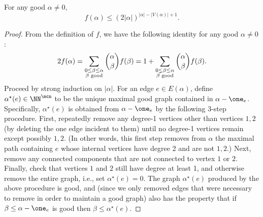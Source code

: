 \documentclass[11pt]{article}
\begin{document}
\begin{lemma}\label{lem:f:upper:bound}
For any good $\alpha \ne 0$,
\[
f(\alpha)\leq (2 |\alpha|)^{|\alpha|-|V(\alpha)|+1}.
\]
\end{lemma}

\begin{proof}
From the definition of $f$, we have the following identity for any good $\alpha \ne 0$:
\begin{equation}\label{eq:f-identity}
2f(\alpha)=\sum_{\substack{0 \le \beta \le \alpha \\ \beta \textnormal{ good}}} \binom{\alpha}{\beta}f(\beta) = 1 + \sum_{\substack{0 \lneq \beta \le \alpha \\ \beta \textnormal{ good}}} \binom{\alpha}{\beta}f(\beta).
\end{equation}
Proceed by strong induction on $|\alpha|$. For an edge $e \in E(\alpha)$, define $\alpha^\star(e) \in \NN^{\mcn}$ to be the unique maximal good graph contained in $\alpha - \one_e$. Specifically, $\alpha^\star(e)$ is obtained from $\alpha - \one_e$ by the following 3-step procedure. First, repeatedly remove any degree-1 vertices other than vertices $1,2$ (by deleting the one edge incident to them) until no degree-1 vertices remain except possibly $1,2$. (In other words, this first step removes from $\alpha$ the maximal path containing $e$ whose internal vertices have degree 2 and are not $1,2$.) Next, remove any connected components that are not connected to vertex $1$ or $2$. Finally, check that vertices $1$ and $2$ still have degree at least 1, and otherwise remove the entire graph, i.e., set $\alpha^\star(e) = 0$. The graph $\alpha^\star(e)$ produced by the above procedure is good, and (since we only removed edges that were necessary to remove in order to maintain a good graph) also has the property that if $\beta \le \alpha - \one_e$ is good then $\beta \le \alpha^\star(e)$.


\end{proof}
\end{document}
